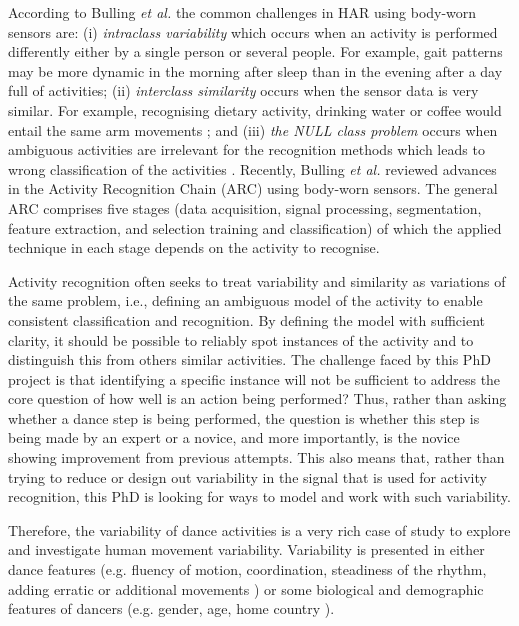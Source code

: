 \documentclass[10pt,journal,compsoc]{IEEEtran}
\begin{document}
According to Bulling \textit{et al.} \cite{bulling2014} the common challenges in HAR
using body-worn sensors are: 
(i) \textit{intraclass variability} which occurs when an activity is performed differently 
either by a single person or several people. For example, gait patterns may be more
dynamic in the morning after sleep than in the evening after a day full of activities; 
(ii) \textit{interclass similarity} occurs when the sensor data is very similar. For example,
recognising dietary activity, drinking water or coffee would entail the same arm movements 
\cite{amft2008phd}; and (iii) \textit{the NULL class problem} occurs 
when ambiguous activities are irrelevant for the recognition methods
which leads to wrong classification of the activities \cite{amft2011}.
Recently, Bulling \textit{et al.} \cite{bulling2014} reviewed advances in the Activity
Recognition Chain (ARC) using body-worn sensors. The general ARC comprises five stages
(data acquisition, signal processing, segmentation, feature extraction, and selection
training and classification) of which the applied technique in each stage depends on the
activity to recognise.


Activity recognition often seeks to treat variability and 
similarity as variations of the same problem, i.e., defining 
an ambiguous model of the activity to enable consistent
classification and recognition. By defining the model 
with sufficient clarity, it should be possible to reliably spot 
instances of the activity and to distinguish this from others
similar activities. The challenge faced by this PhD project 
is that identifying a specific instance will not be sufficient
to address the core question of how well is an action being performed?
Thus, rather than asking whether a dance step is being performed,
the question is whether this step is being made by an expert or a novice,
and more importantly, is the novice showing improvement from 
previous attempts. This 
also means that, rather than trying to reduce or design out
variability in the signal that is used for activity recognition,
this PhD is looking for ways to model and work with such
variability.


Therefore, the variability of dance activities is a very rich 
case of study to explore and investigate human 
movement variability. Variability is presented in either dance 
features (e.g. fluency of motion, coordination, steadiness of 
the rhythm, adding erratic or additional movements \cite{Grammer2011, Aristidou2014}) 
or some biological and demographic features of dancers 
(e.g. gender, age, home country \cite{Grammer2011, Iwai2011}). 
\end{document}
